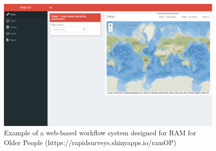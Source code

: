 \documentclass[12pt,a4paper]{article}
\begin{document}
\begin{figure}[H]

{\centering \includegraphics[width=0.9\linewidth]{figures/webWorkflow} 

}

\caption{Example of a web-based workflow system designed for RAM for Older People (https://rapidsurveys.shinyapps.io/ramOP)}\label{fig:workflow2}
\end{figure}


\end{document}
